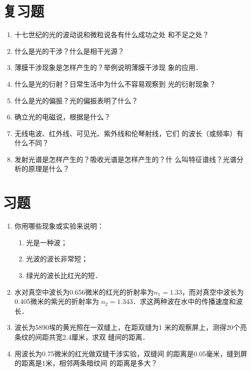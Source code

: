 \section*{复习题}
\begin{enumerate}
\item 十七世纪的光的波动说和微粒说各有什么成功之处
和不足之处？
\item 什么是光的干涉？什么是相干光源？
\item 薄膜干涉现象是怎样产生的？举例说明薄膜干涉现
象的应用．
\item 什么是光的衍射？日常生活中为什么不容易观察到
光的衍射现象？
\item 什么是光的偏振？光的偏振表明了什么？
\item 确立光的电磁说，根据是什么？
\item 无线电波、红外线、可见光、紫外线和伦琴射线，它们
的波长（或频率）有什么不同？
\item 发射光谱是怎样产生的？吸收光谱是怎样产生的？什
么叫特征谱线？光谱分析的原理是什么？
\end{enumerate}

\section*{习题}

\begin{enumerate}
    \item 你用哪些现象或实验来说明：
    \begin{enumerate}
        \item 光是一种波；
        \item 光波的波长非常短；
        \item 绿光的波长比红光的短．
    \end{enumerate}
    \item 水对真空中波长为0.656微米的红光的折射率为$n_1
    =1.33$，而对真空中波长为0.405微米的紫光的折射率为
    $n_2=1.343$．求这两种波在水中的传播速度和波长．
    \item 波长为5890埃的黄光照在一双缝上，在距双缝为1
    米的观察屏上，测得20个亮条纹的间距共宽2.4厘米，求双
    缝间的距离．
    \item 用波长为0.75微米的红光做双缝干涉实验，双缝间
    的距离是0.05毫米，缝到屏的距离是1米，相邻两条暗纹间
    的距离是多大？
\end{enumerate}



